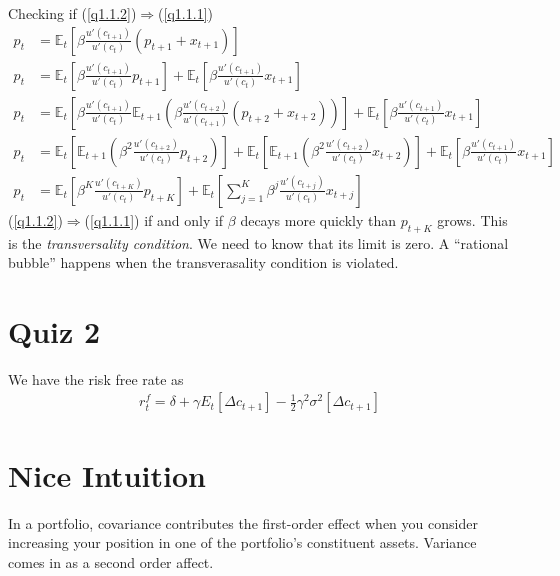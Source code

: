 \documentclass[12pt]{article}
\theoremstyle{plain}
\theoremstyle{definition}
\theoremstyle{remark}
\begin{document}
Checking if (\ref{q1.1.2})$\Rightarrow$(\ref{q1.1.1})
\begin{align*}
  p_t &= \mathbb{E}_t\left[
    \beta \frac{u'(c_{t+1})}{u'(c_t)} (p_{t+1}+x_{t+1})
  \right] \\
  p_t &=
  \mathbb{E}_t\left[
    \beta \frac{u'(c_{t+1})}{u'(c_t)} p_{t+1}
  \right]
  +\mathbb{E}_t\left[
    \beta \frac{u'(c_{t+1})}{u'(c_t)} x_{t+1}
  \right] \\
  p_t &=
  \mathbb{E}_t\left[
    \beta \frac{u'(c_{t+1})}{u'(c_t)}
    \mathbb{E}_{t+1}\left(
    \beta \frac{u'(c_{t+2})}{u'(c_{t+1})} (p_{t+2}+x_{t+2})
  \right)
  \right]
  +\mathbb{E}_t\left[
    \beta \frac{u'(c_{t+1})}{u'(c_t)} x_{t+1}
  \right] \\
  p_t &=
  \mathbb{E}_t\left[
    \mathbb{E}_{t+1}\left(
    \beta^2 \frac{u'(c_{t+2})}{u'(c_t)} p_{t+2}
  \right)
  \right]
  +\mathbb{E}_t\left[
    \mathbb{E}_{t+1}\left(
    \beta^2 \frac{u'(c_{t+2})}{u'(c_t)} x_{t+2}
  \right)
  \right]
  +\mathbb{E}_t\left[
    \beta \frac{u'(c_{t+1})}{u'(c_t)} x_{t+1}
  \right] \\
  p_t &=
  \mathbb{E}_t\left[
    \beta^K \frac{u'(c_{t+K})}{u'(c_t)} p_{t+K}
  \right]
  +\mathbb{E}_t\left[
    \sum^K_{j=1}
    \beta^j \frac{u'(c_{t+j})}{u'(c_t)} x_{t+j}
  \right]
\end{align*}
(\ref{q1.1.2})$\Rightarrow$(\ref{q1.1.1}) if and only if $\beta$ decays
more quickly than $p_{t+K}$ grows. This is the \emph{transversality
condition}. We need to know that its limit is zero. A ``rational
bubble'' happens when the transverasality condition is violated.


\clearpage
\section{Quiz 2}

We have the risk free rate as
\begin{align*}
  r^f_t = \delta + \gamma E_t[\Delta c_{t+1}]
  - \frac{1}{2} \gamma^2 \sigma^2[\Delta c_{t+1}]
\end{align*}

\section{Nice Intuition}


In a portfolio, covariance contributes the first-order effect when you
consider increasing your position in one of the portfolio's constituent
assets. Variance comes in as a second order affect.
\end{document}

